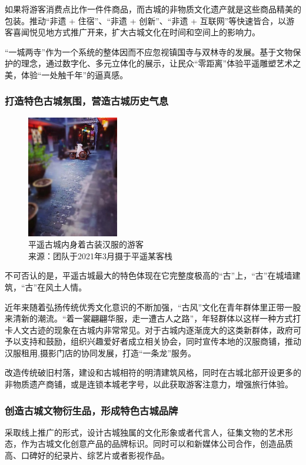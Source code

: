 \documentclass[UTF8]{ctexart}
\begin{document}
        如果将游客消费点比作一件件商品，而古城的非物质文化遗产就是这些商品精美的包装。推动“非遗 + 住宿”、“非遗 + 创新”、“非遗 + 互联网”等快速皆合，以游客喜闻悦见地方式推广开来，扩大古城文化在时间和空间上的影响力。
    
        “一城两寺”作为一个系统的整体因而不应忽视镇国寺与双林寺的发展。基于文物保护的理念，通过数字化、多元立体化的展示，让民众“零距离”体验平遥雕塑艺术之美，体验“一处触千年”的逼真感。
        \subsubsection{打造特色古城氛围，营造古城历史气息}
            \begin{figure}[H]
                \centering
                \includegraphics[width=4cm]{汉服.jpeg}
                \caption[plain]{平遥古城内身着古装汉服的游客\\来源：团队于2021年3月摄于平遥某客栈}
        
            \end{figure}
            不可否认的是，平遥古城最大的特色体现在它完整度极高的“古”上，“古”在城墙建筑，“古”在风土人情。
            
            近年来随着弘扬传统优秀文化意识的不断加强，“古风”文化在青年群体里正带一股来清新的潮流。“着一裳翩翩华服，走一遭古人之路”，年轻群体以这样一种方式打卡人文古迹的现象在古城内非常常见。对于古城内逐渐庞大的这类新群体，政府可予以支持和鼓励，组织兴趣爱好者成立相关协会，同时宣传本地的汉服商铺，推动汉服租用,摄影门店的协同发展，打造“一条龙”服务。
            
            改造传统破旧村落，建设和古城相符的明清建筑风格，同时在古城北部开设更多的非物质遗产商铺，或是连锁本城老字号，以此获取游客注意力，增强旅行体验。
        \subsubsection{创造古城文物衍生品，形成特色古城品牌}
            采取线上推广的形式，设计古城独属的文化形象或者代言人，征集文物的艺术形态，作为古城文化创意产品的品牌标识。同时可以和新媒体公司合作，创造品质高、口碑好的纪录片、综艺片或者影视作品。
            
\end{document}
